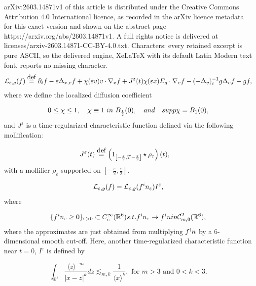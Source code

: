 \documentclass[10pt,a4paper]{amsart}
\newcommand{\eqdef }{\overset{\mbox{\tiny{def}}}{=}}
\begin{document}
arXiv:2603.14871v1 of this article is distributed under the Creative Commons Attribution 4.0 International licence, as recorded in the arXiv licence metadata for this exact version and shown on the abstract page https://arxiv.org/abs/2603.14871v1. A full rights notice is delivered at licenses/arxiv-2603.14871-CC-BY-4.0.txt. Characters: every retained excerpt is pure ASCII, so the delivered engine, XeLaTeX with its default Latin Modern text font, reports no missing character.
\begin{align}\label{def.Leg}
\mathcal{L}_{\varepsilon,g}(f) \eqdef  \partial_t f - \varepsilon \Delta_{x,v}f + \chi(\varepsilon v)v\cdot\nabla_x f + J^{\varepsilon}(t)\chi(\varepsilon x) E_g\cdot\nabla_v f - (-\Delta_v)_\varepsilon^{-1}g \Delta_vf - gf,
\end{align}where we define the localized diffusion coefficient

\begin{align}\label{def cutoff}
0\le \chi\le 1,\quad \chi\equiv1\,\,\textup{ in }\,\,B_{\frac{1}{2}}(0), \quad \textup{ and }\quad \textup{supp }\chi=B_1(0),
\end{align} and $J^\varepsilon$ is a time-regularized characteristic function defined via the following mollification:

\begin{align}\label{reg interval}
J^\varepsilon(t) &\eqdef \left(1_{\left[-\frac{\varepsilon}{2},T-\frac{\varepsilon}{2}\right]}\star \rho_\varepsilon\right)(t),
\end{align}with a mollifier $\rho_\varepsilon$ supported on $\left[-\frac{\varepsilon}{2}, \frac{\varepsilon}{2}\right]$.

\begin{align}\label{semi}
\mathcal{L}_{\varepsilon,g}(f) = \mathcal{L}_{\varepsilon,g}(f^\textup{in}_\varepsilon)I^\varepsilon,
\end{align}where

\begin{align}\label{approx initial}
    \{f^\textup{in}_\varepsilon\ge0\}_{\varepsilon>0}\subset C^\infty_c(\mathbb{R}^6)\textup{ s.t. } f^\textup{in}_\varepsilon \to f^\textup{in} \textup{ in }\mathcal{C}^2_{m,0}(\mathbb{R}^6),
\end{align}where the approximates are just obtained from multiplying $f^\textup{in}$ by a $6$-dimensional smooth cut-off. Here, another time-regularized characteristic function near $t=0$, $I^\varepsilon$ is defined by

\begin{equation}\label{int decay}
    \int_{\mathbb{R}^3}\frac{\langle z\rangle^{-m}}{|x-z|^k}dz \lesssim_{m,k} \frac{1}{\langle x\rangle^k}, \text{ for }m>3\text{ and }0<k<3.
\end{equation}
\end{document}
